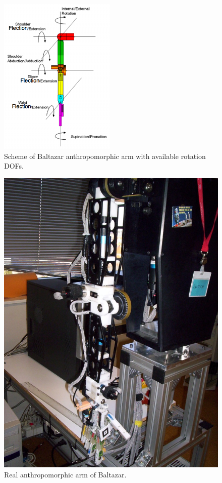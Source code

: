 \begin{figure}
\centering
\includegraphics{figures/balta_arm_scheme} 
\caption[Scheme of Baltazar anthropomorphic arm]{Scheme of Baltazar anthropomorphic arm with available rotation \acp{DOF}.}
\label{img:balta_arm_scheme}
\end{figure}

\begin{figure}
\centering
\includegraphics{figures/balta_arm_real} 
\caption[Real Baltazar anthropomorphic arm]{Real anthropomorphic arm of Baltazar.}
\label{img:balta_arm_real}
\end{figure}

